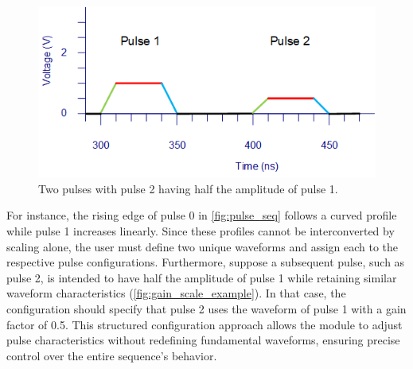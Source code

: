 \begin{figure}[ht]
    \setlength{\abovecaptionskip}{5pt}    %
    \setlength{\belowcaptionskip}{5pt}    %
    \centering
    \includegraphics[width=0.7\linewidth]{figures/3.1.1.png}
    \caption{Two pulses with pulse 2 having half the amplitude of pulse 1.}
    \label{fig:gain_scale_example}
\end{figure}

For instance, the rising edge of pulse 0 in \autoref{fig:pulse_seq} follows a curved profile while pulse 1 increases linearly. Since these profiles cannot be interconverted by scaling alone, the user must define two unique waveforms and assign each to the respective pulse configurations. Furthermore, suppose a subsequent pulse, such as pulse 2, is intended to have half the amplitude of pulse 1 while retaining similar waveform characteristics (\autoref{fig:gain_scale_example}). In that case, the configuration should specify that pulse 2 uses the waveform of pulse 1 with a gain factor of 0.5. This structured configuration approach allows the module to adjust pulse characteristics without redefining fundamental waveforms, ensuring precise control over the entire sequence's behavior.

